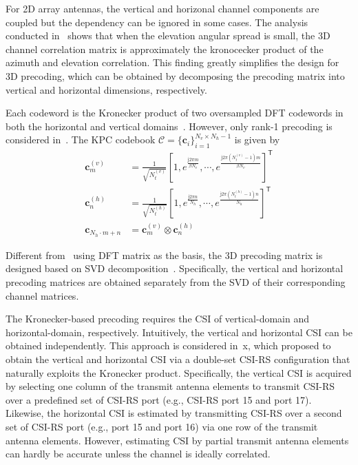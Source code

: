 \documentclass[a4paper,12pt]{article}%
\begin{document}
For 2D array antennas, the vertical and horizonal channel components are coupled but the dependency can be ignored in some cases. The analysis conducted in~\cite{YingVookThomasEtAl2014} shows that when the elevation angular spread is small, the 3D channel correlation matrix is approximately the kronocecker product of the azimuth and elevation correlation. This finding greatly simplifies the design for 3D precoding, which can be obtained by decomposing the precoding matrix into vertical and horizontal dimensions, respectively.

Each codeword is the Kronecker product of two oversampled DFT codewords in both the horizontal and vertical domains~\cite{Xie2013}. However, only rank-1 precoding is considered in~\cite{Xie2013}. The KPC codebook $\mathcal{C}=\{\bm{c}_i\}_{i=1}^{N_v \times N_h -1}$ is given by
\begin{align}
\bm{c}_m^{(v)} &= \frac{1}{\sqrt{N_t^{(v)}}} \left[ 1, e^{\frac{ \mathrm{j} 2\pi m }{\beta N_v}}, \cdots, e^{\frac{ \mathrm{j} 2\pi (N_t^{(v)}-1) m }{\beta N_v}} \right]^\mathsf{T} \\
\bm{c}_n^{(h)} &= \frac{1}{\sqrt{N_t^{(h)}}} \left[ 1, e^{\frac{ \mathrm{j} 2\pi n }{ N_h}}, \cdots, e^{\frac{ \mathrm{j} 2\pi (N_t^{(h)}-1) n }{ N_h }} \right]^\mathsf{T} \\
\bm{c}_{N_h\cdot m +n} &= \bm{c}_m^{(v)} \otimes \bm{c}_n^{(h)}\label{eq:kronecker-precoding}
\end{align}

Different from~\cite{Xie2013} using DFT matrix as the basis, the 3D precoding matrix is designed based on SVD decomposition~\cite{GuoFanLiEtAl2015}. Specifically, the vertical and horizontal precoding matrices are obtained separately from the SVD of their corresponding channel matrices.

The Kronecker-based precoding requires the CSI of vertical-domain and horizontal-domain, respectively. Intuitively, the vertical and horizontal CSI can be obtained independently. This approach is considered in~x, which proposed to obtain the vertical and horizontal CSI via a double-set CSI-RS configuration that naturally exploits the Kronecker product. Specifically, the vertical CSI is acquired by selecting one column of the transmit antenna elements to transmit CSI-RS over a predefined set of CSI-RS port (e.g., CSI-RS port 15 and port 17). Likewise, the horizontal CSI is estimated by transmitting CSI-RS over a second set of CSI-RS port (e.g., port 15 and port 16) via one row of the transmit antenna elements. However, estimating CSI by partial transmit antenna elements can hardly be accurate unless the channel is ideally correlated.
\end{document}
